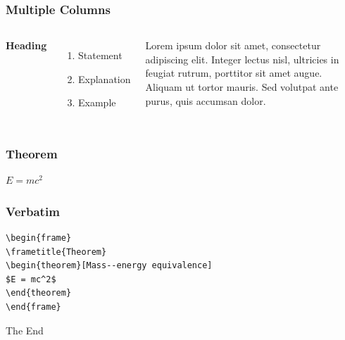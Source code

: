 \documentclass[12pt]{beamer}\usepackage[]{graphicx}\usepackage[]{color}
\begin{document}
\begin{frame}
\frametitle{Multiple Columns}
\begin{columns}[c] %

\textbf{Heading}
\begin{enumerate}
\item Statement
\item Explanation
\item Example
\end{enumerate}

Lorem ipsum dolor sit amet, consectetur adipiscing elit. Integer lectus nisl, ultricies in feugiat rutrum, porttitor sit amet augue. Aliquam ut tortor mauris. Sed volutpat ante purus, quis accumsan dolor.

\end{columns}
\end{frame}


\begin{frame}
\frametitle{Theorem}
\begin{theorem}
$E = mc^2$
\end{theorem}
\end{frame}

\begin{frame}[fragile] %
\frametitle{Verbatim}
\begin{example}
\begin{verbatim}
\begin{frame}
\frametitle{Theorem}
\begin{theorem}[Mass--energy equivalence]
$E = mc^2$
\end{theorem}
\end{frame}\end{verbatim}
\end{example}
\end{frame}

\begin{frame}
\Huge{\centerline{The End}}
\end{frame}

\end{document}
